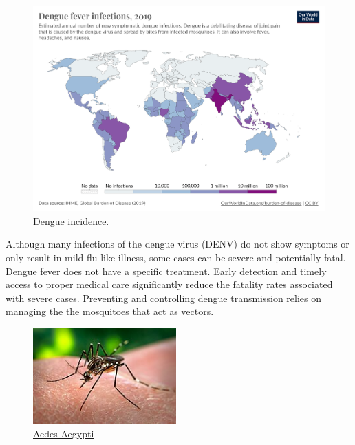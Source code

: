 \documentclass[
  letterpaper,
  DIV=11,
  numbers=noendperiod]{scrreprt}
\begin{document}
\begin{figure}

{\centering \includegraphics[width=11.33in,height=\textheight]{img/dengueincidence.png}

}

\caption{\label{fig-dengueincidence}\href{https://ourworldindata.org/grapher/dengue-incidence}{Dengue
incidence}.}

\end{figure}

Although many infections of the dengue virus (DENV) do not show symptoms
or only result in mild flu-like illness, some cases can be severe and
potentially fatal. Dengue fever does not have a specific treatment.
Early detection and timely access to proper medical care significantly
reduce the fatality rates associated with severe cases. Preventing and
controlling dengue transmission relies on managing the the mosquitoes
that act as vectors.

\begin{figure}

{\centering \includegraphics[width=0.49\textwidth,height=\textheight]{img/aedesaegypti.jpg}

}

\caption{\label{fig-aedesaegypti}\href{https://en.wikipedia.org/wiki/Aedes_aegypti\#/media/File:Aedes_aegypti_CDC-Gathany.jpg}{Aedes
Aegypti}}

\end{figure}
\end{document}
